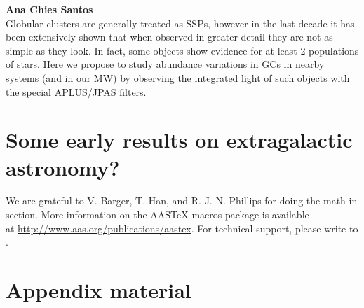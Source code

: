 \documentclass[12pt,preprint]{aastex}
\begin{document}
{\bf Ana Chies Santos}\\
Globular clusters are generally treated as SSPs, however in the last decade it has been extensively shown that when observed in greater detail they are not as simple as they look. In fact, some objects show evidence for at least 2 populations of stars. Here we propose to study abundance variations in GCs in nearby systems (and in our MW) by observing the integrated light of such objects with the special APLUS/JPAS filters.


\section{Some early results on extragalactic astronomy?}

\acknowledgments

We are grateful to V. Barger, T. Han, and R. J. N. Phillips for
doing the math in section.
More information on the AASTeX macros package is available \\ at
\url{http://www.aas.org/publications/aastex}.
For technical support, please write to
.


\appendix

\section{Appendix material}




\clearpage
\end{document}
